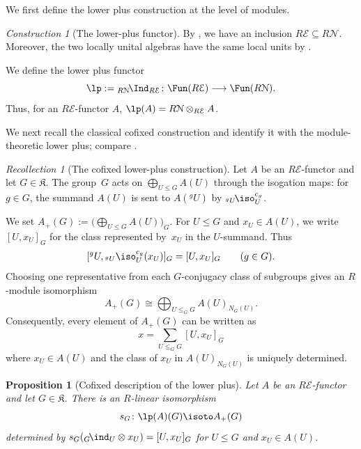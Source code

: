 \documentclass{amsart}
\numberwithin{equation}{section}%
\newtheorem{Prop}[equation]{Proposition}
\theoremstyle{remark}
\newtheorem{Cons}[equation]{Construction}
\newtheorem{Rec}[equation]{Recollection}
\theoremstyle{definition}
\newcommand{\e}{\mathcal E}
\newcommand{\n}{\mathcal N}
\newcommand{\lind}[1]{{}_{#1}\!\ind}
\newcommand{\liso}[1]{{}_{#1}\!\iso}
\newcommand{\iInd}[2]{{}_{#1}\!\Ind_{#2}}
\begin{document}
We first define the lower plus construction at the level of modules.
%
\begin{Cons}[The lower-plus functor]
\label{con:lower-plus}
By , we have an inclusion
$R\e\subseteq R\n$.  Moreover, the two locally unital algebras
have the same local units by .

We define the lower plus functor
\[
\lp
:=
\iInd{R\n}{R\e}
\colon
\Fun(R\e)\longrightarrow\Fun(R\n).
\]
Thus, for an $R\e$-functor $A$,
$\lp(A)=R\n\otimes_{R\e}A$.
%
\end{Cons}
%
We next recall the classical cofixed construction and identify it
with the module-theoretic lower plus; compare
\cite[Sec.~2.2]{Boltje98a}.
%
\begin{Rec}[The cofixed lower-plus construction]
\label{rec:cofixed-lower-plus}
Let $A$ be an $R\e$-functor and let $G\in\mathfrak K$.
The group~$G$ acts on $\bigoplus\limits_{U\leq G}A(U)$ through
the isogation maps: for $g\in G$, the summand $A(U)$ is sent to
$A({}^gU)$ by ${}\liso{{}^gU}_U^{c_g}$.
	
We set
$A_+(G):=\Big(\bigoplus\limits_{U\leq G}A(U)\Big)_G$.
For $U\leq G$ and $x_U\in A(U)$, we write $[U,x_U]_G$ for the
class represented by~$x_U$ in the $U$-summand.
Thus
%
\[
[{}^gU,{}_{{}^gU}\iso_U^{c_g}(x_U)]_G
=
[U,x_U]_G
\qquad
(g\in G).
\]
%
Choosing one representative from each $G$-conjugacy class of
subgroups gives an $R$-module isomorphism
%
\[
A_+(G)
\cong
\bigoplus_{U\leq_G G}
A(U)_{N_G(U)}.
\]
%
Consequently, every element of $A_+(G)$ can be written as
%
\[
x
=
\sum_{U\leq_G G}[U,x_U]_G
\]
%
where $x_U\in A(U)$ and the class of $x_U$ in
$A(U)_{N_G(U)}$ is uniquely determined.
%
\end{Rec}
%
\begin{Prop}[Cofixed description of the lower plus]
\label{prop:lower-plus-cofixed}
Let $A$ be an $R\e$-functor and let $G\in\mathfrak K$.
There is an $R$-linear isomorphism
%
\[
s_G\colon
\lp(A)(G)
\isoto
A_+(G)
\]
%
determined by
$s_G({}\lind{G}_U\otimes x_U)=[U,x_U]_G$
for $U\leq G$ and $x_U\in A(U)$.
\end{Prop}
%
\end{document}
